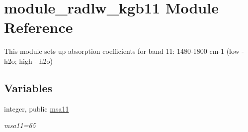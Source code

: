 \hypertarget{namespacemodule__radlw__kgb11}{}\section{module\+\_\+radlw\+\_\+kgb11 Module Reference}
\label{namespacemodule__radlw__kgb11}


This module sets up absorption coefficients for band 11\+: 1480-\/1800 cm-\/1 (low -\/ h2o; high -\/ h2o)  


\subsection*{Variables}
\begin{DoxyCompactItemize}
\item 
\mbox{\label{namespacemodule__radlw__kgb11_afd15a7b87b3d49c53c12e023c604b360}} 
integer, public \hyperlink{namespacemodule__radlw__kgb11_afd15a7b87b3d49c53c12e023c604b360}{msa11}
\begin{DoxyCompactList}\small\item\em msa11=65 \end{DoxyCompactList}\end{DoxyCompactItemize}

